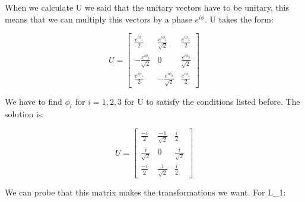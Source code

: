 When we calculate U we said that the unitary vectors have to be unitary, this means that we can multiply this vectors by a phase $e^{i\phi}$. U takes the form:

\begin{equation}
  U = \left[\begin{matrix}
    \frac{e^{i\phi_1}}{2} & \frac{e^{i\phi_2}}{\sqrt{2}} & \frac{e^{i\phi_3}}{2}\\
    -\frac{e^{i\phi_1}}{\sqrt{2}} & 0 & \frac{e^{i\phi_3}}{\sqrt{2}}\\
    \frac{e^{i\phi_1}}{2} & -\frac{e^{i\phi_2}}{\sqrt{2}} & \frac{e^{i\phi_3}}{2}
  \end{matrix}\right]
\end{equation}

We have to find $\phi_i$ for $i=1,2,3$ for U to satisfy the conditions listed before. The solution is:


\begin{equation}
  U = \left[\begin{matrix}
    \frac{-i}{2} & \frac{-1}{\sqrt{2}} & \frac{i}{2}\\
    \frac{i}{\sqrt{2}} & 0 & \frac{i}{\sqrt{2}}\\
    \frac{-i}{2} & \frac{1}{\sqrt{2}} & \frac{i}{2}
  \end{matrix}\right]
\end{equation}

We can probe that this matrix makes the transformations we want. For L_1:

